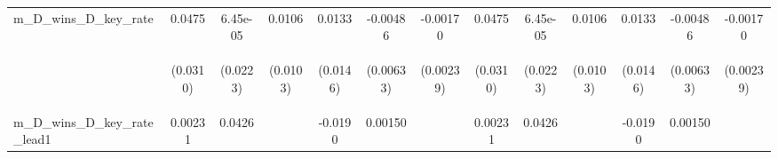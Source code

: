 \documentclass[]{article}
\begin{document}
\begin{center}
\begin{tabular}{lcccccccccccc}
m\_D\_wins\_D\_key\_rate & 0.0475 & 6.45e-05 & 0.0106 & 0.0133 & -0.00486 & -0.00170 & 0.0475 & 6.45e-05 & 0.0106 & 0.0133 & -0.00486 & -0.00170 \\
\vspace{4pt} & \begin{footnotesize}(0.0310)\end{footnotesize} & \begin{footnotesize}(0.0223)\end{footnotesize} & \begin{footnotesize}(0.0103)\end{footnotesize} & \begin{footnotesize}(0.0146)\end{footnotesize} & \begin{footnotesize}(0.00633)\end{footnotesize} & \begin{footnotesize}(0.00239)\end{footnotesize} & \begin{footnotesize}(0.0310)\end{footnotesize} & \begin{footnotesize}(0.0223)\end{footnotesize} & \begin{footnotesize}(0.0103)\end{footnotesize} & \begin{footnotesize}(0.0146)\end{footnotesize} & \begin{footnotesize}(0.00633)\end{footnotesize} & \begin{footnotesize}(0.00239)\end{footnotesize} \\
m\_D\_wins\_D\_key\_rate\_lead1 & 0.00231 & 0.0426 &  & -0.0190 & 0.00150 &  & 0.00231 & 0.0426 &  & -0.0190 & 0.00150 &  \\

\end{tabular}
\end{center}
\end{document}
